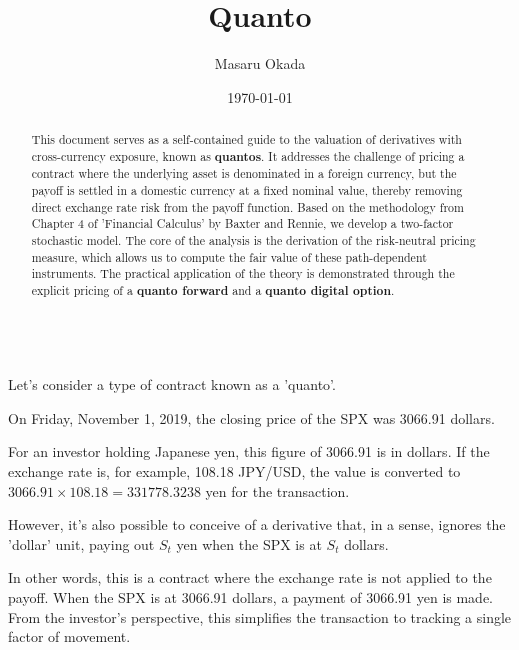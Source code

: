 \documentclass[uplatex,a4j,12pt,dvipdfmx]{jsarticle}
\title{
Quanto
}
\author{Masaru Okada}
\date{\today}
\begin{document}
\maketitle


\begin{abstract}
	This document serves as a self-contained guide to the valuation of derivatives with cross-currency exposure, known as \textbf{quantos}. It addresses the challenge of pricing a contract where the underlying asset is denominated in a foreign currency, but the payoff is settled in a domestic currency at a fixed nominal value, thereby removing direct exchange rate risk from the payoff function.
	Based on the methodology from Chapter 4 of 'Financial Calculus' by Baxter and Rennie, we develop a two-factor stochastic model. The core of the analysis is the derivation of the risk-neutral pricing measure, which allows us to compute the fair value of these path-dependent instruments. The practical application of the theory is demonstrated through the explicit pricing of a \textbf{quanto forward} and a \textbf{quanto digital option}.
\end{abstract}

\tableofcontents

\ \\

Let's consider a type of contract known as a 'quanto'.

On Friday, November 1, 2019, the closing price of the SPX was 3066.91 dollars.

For an investor holding Japanese yen, this figure of 3066.91 is in dollars.
If the exchange rate is, for example, 108.18 JPY/USD,
the value is converted to $3066.91 \times 108.18 = 331778.3238$ yen for the transaction.

However, it's also possible to conceive of a derivative that, in a sense, ignores the 'dollar' unit,
paying out $S_{t}$ yen when the SPX is at $S_{t}$ dollars.

In other words, this is a contract where the exchange rate is not applied to the payoff.
When the SPX is at 3066.91 dollars, a payment of 3066.91 yen is made.
From the investor's perspective, this simplifies the transaction to tracking a single factor of movement.
\end{document}
